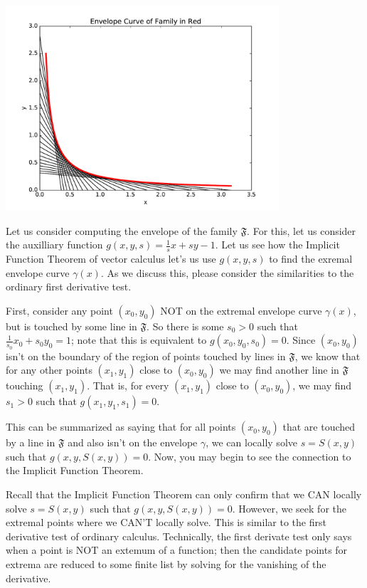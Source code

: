 \includegraphics[width = 4.0in]{calculus/hyperbolaEnvelope.pdf}

Let us consider computing the envelope of the family \(\mathfrak F\). For this, let us consider the auxilliary function
\(g(x,y,s) = \frac{1}{s} x + s y - 1\). Let us see how the Implicit Function Theorem of vector calculus let's us
use \(g(x,y, s)\) to find the exremal envelope curve \(\gamma(x)\). As we discuss this, please consider the similarities to the ordinary first derivative test.

First, consider any point \((x_0, y_0)\) NOT on the extremal envelope curve \(\gamma(x)\), but is touched by some line in \(\mathfrak F\). 
So there is some \(s_0 > 0\) such that \(\frac{1}{s_0} x_0 + s_0 y_0 = 1\); note that this is equivalent to \(g(x_0, y_0, s_0) = 0\). 
Since \((x_0, y_0)\) isn't on the boundary of the region of points touched by lines in \(\mathfrak F\), we know that for any other points \((x_1, y_1)\) close to \((x_0, y_0)\) we may find another line in \(\mathfrak F\) touching \((x_1, y_1)\). 
That is, for every \((x_1, y_1)\) close to \((x_0, y_0)\), we may find \(s_1 > 0\) such that \(g(x_1, y_1, s_1) = 0\).  

This can be summarized as saying that for all points \((x_0, y_0)\) that are touched by a line in \(\mathfrak F\) and also isn't on the envelope \(\gamma\), we can locally solve \(s = S(x,y)\) such that \(g(x, y, S(x, y)) = 0\). Now, you may begin to see the connection to the Implicit Function Theorem.

Recall that the Implicit Function Theorem can only confirm that we CAN locally solve \(s = S(x,y)\) such that \(g(x, y, S(x, y)) = 0\). However, we seek for the extremal points where we CAN'T locally solve. This is similar to the first derivative test of ordinary calculus. Technically, the first derivate test only says when a point is NOT an extemum of a function; then the candidate points for extrema are reduced to some finite list by solving for the vanishing of the derivative.

